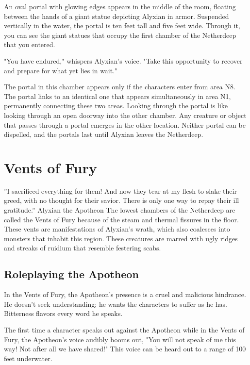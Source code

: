 \documentclass[10pt,a4paper,twoside,bg=print,twocolumn,openany,nodeprecatedcode]{dndbook}
\begin{document}
\begin{DndReadAloud}{}
An oval portal with glowing edges appears in the middle of the room, floating between the hands of a giant statue depicting Alyxian in armor. Suspended vertically in the water, the portal is ten feet tall and five feet wide. Through it, you can see the giant statues that occupy the first chamber of the Netherdeep that you entered.

"You have endured," whispers Alyxian's voice. "Take this opportunity to recover and prepare for what yet lies in wait."

\end{DndReadAloud}

The portal in this chamber appears only if the characters enter from area N8. The portal links to an identical one that appears simultaneously in area N1, permanently connecting these two areas. Looking through the portal is like looking through an open doorway into the other chamber. Any creature or object that passes through a portal emerges in the other location. Neither portal can be dispelled, and the portals last until Alyxian leaves the Netherdeep.

\section{Vents of Fury}
\DndQuote%
{}
{''I sacrificed everything for them! And now they tear at my flesh to slake their greed, with no thought for their savior. There is only one way to repay their ill gratitude.''}
{Alyxian the Apotheon}
The lowest chambers of the Netherdeep are called the Vents of Fury because of the steam and thermal fissures in the floor. These vents are manifestations of Alyxian's wrath, which also coalesces into monsters that inhabit this region. These creatures are marred with ugly ridges and streaks of ruidium that resemble festering scabs.

\subsection{Roleplaying the Apotheon}
In the Vents of Fury, the Apotheon's presence is a cruel and malicious hindrance. He doesn't seek understanding; he wants the characters to suffer as he has. Bitterness flavors every word he speaks.

The first time a character speaks out against the Apotheon while in the Vents of Fury, the Apotheon's voice audibly booms out, "You will not speak of me this way! Not after all we have shared!" This voice can be heard out to a range of 100 feet underwater.
\end{document}
